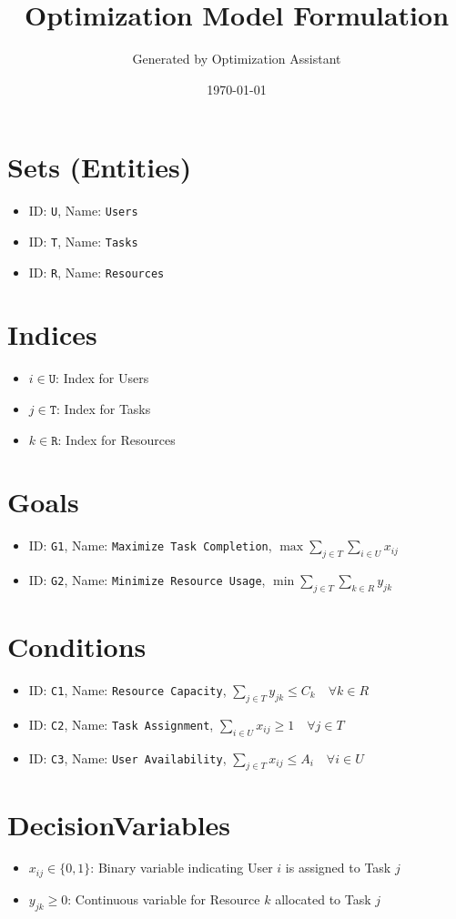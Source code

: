 \documentclass{article}
\title{Optimization Model Formulation}
\author{Generated by Optimization Assistant}
\date{\today}
\begin{document}
\maketitle
\tableofcontents
\newpage

\section{Sets (Entities)}
\begin{itemize}
    \item ID: \texttt{U}, Name: \texttt{Users}
    \item ID: \texttt{T}, Name: \texttt{Tasks}
    \item ID: \texttt{R}, Name: \texttt{Resources}
\end{itemize}

\section{Indices}
\begin{itemize}
    \item $i \in \texttt{U}$: Index for Users
    \item $j \in \texttt{T}$: Index for Tasks
    \item $k \in \texttt{R}$: Index for Resources
\end{itemize}

\section{Goals}
\begin{itemize}
    \item ID: \texttt{G1}, Name: \texttt{Maximize Task Completion}, $\max \sum_{j \in T} \sum_{i \in U} x_{ij}$
    \item ID: \texttt{G2}, Name: \texttt{Minimize Resource Usage}, $\min \sum_{j \in T} \sum_{k \in R} y_{jk}$
\end{itemize}

\section{Conditions}
\begin{itemize}
    \item ID: \texttt{C1}, Name: \texttt{Resource Capacity}, $\sum_{j \in T} y_{jk} \leq C_k \quad \forall k \in R$
    \item ID: \texttt{C2}, Name: \texttt{Task Assignment}, $\sum_{i \in U} x_{ij} \geq 1 \quad \forall j \in T$
    \item ID: \texttt{C3}, Name: \texttt{User Availability}, $\sum_{j \in T} x_{ij} \leq A_i \quad \forall i \in U$
\end{itemize}

\section{DecisionVariables}
\begin{itemize}
    \item $x_{ij} \in \{0,1\}$: Binary variable indicating User $i$ is assigned to Task $j$
    \item $y_{jk} \geq 0$: Continuous variable for Resource $k$ allocated to Task $j$
\end{itemize}
\end{document}
